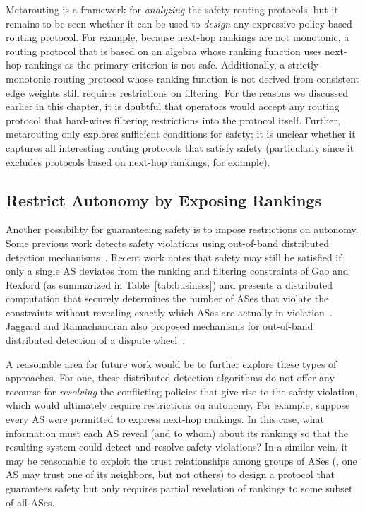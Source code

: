 Metarouting is a framework for {\em analyzing} the
safety routing protocols, but it remains to be seen whether it can be
used to {\em design} any expressive policy-based routing protocol.  For
example, because next-hop rankings are not monotonic, a routing protocol
that is based on an algebra whose ranking function uses next-hop
rankings as the primary criterion is not safe.  Additionally, a strictly
monotonic routing protocol whose ranking function is not derived from
consistent edge weights still requires restrictions on filtering.  For
the reasons we discussed earlier in this chapter, it is doubtful that
operators would accept any routing protocol that hard-wires filtering
restrictions into the protocol itself.  Further, metarouting only
explores sufficient conditions for safety; it is unclear whether it
captures all interesting routing protocols that satisfy safety
(particularly since it excludes protocols based on next-hop rankings,
for example). 

\subsection{Restrict Autonomy by Exposing Rankings}


Another possibility for guaranteeing safety is to impose
restrictions on autonomy.  Some previous work detects safety violations
using out-of-band distributed detection mechanisms~\cite{Jaggard2004,
Machiraju2004}.  Recent work notes that safety may still be satisfied if
only a single AS deviates from the ranking and filtering constraints of
Gao and Rexford (as summarized in Table~\ref{tab:business}) and presents
a distributed computation that securely determines the number of ASes
that violate the constraints without revealing exactly which ASes are
actually in violation~\cite{Machiraju2004}.  Jaggard and Ramachandran
also proposed mechanisms for out-of-band distributed detection of a
dispute wheel~\cite{Jaggard2004}.

A reasonable area for future work would be to further explore these
types of approaches.  For one, these distributed detection
algorithms do not offer any recourse for {\em resolving} the conflicting
policies that give rise to the safety violation, which would ultimately
require restrictions on autonomy.  For example, suppose every AS were
permitted to express next-hop rankings.  In this case, what information
must each AS reveal (and to whom) about its rankings so that the
resulting system could detect and resolve safety violations?  In a
similar vein, it may be reasonable to exploit the trust relationships
among groups of ASes (\eg, one AS may trust one of its neighbors, but
not others) to design a protocol that guarantees safety but only
requires partial revelation of rankings to some subset of all ASes.

